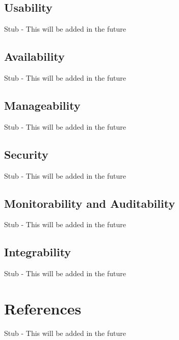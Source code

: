 \documentclass[12pt]{article}
\begin{document}
\subsection{Usability}
Stub - This will be added in the future
\subsection{Availability}
Stub - This will be added in the future
\subsection{Manageability}
Stub - This will be added in the future
\subsection{Security}
Stub - This will be added in the future
\subsection{Monitorability and Auditability}
Stub - This will be added in the future
\subsection{Integrability}
Stub - This will be added in the future

\section{References}
Stub - This will be added in the future
\end{document}

